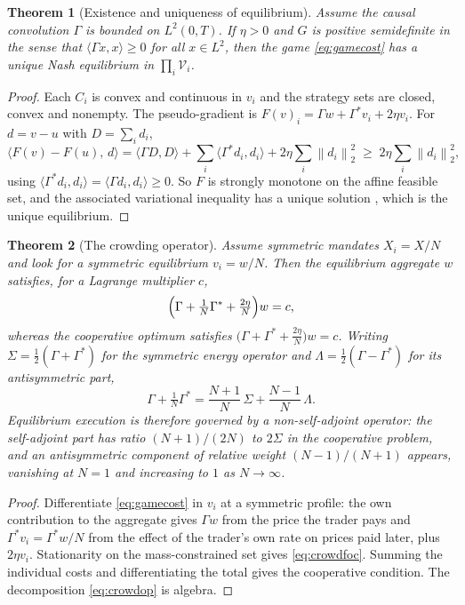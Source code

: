\documentclass[11pt]{article}
\newcommand{\norm}[1]{\left\lVert #1\right\rVert}
\numberwithin{equation}{section}
\newtheorem{theorem}{Theorem}[section]
\theoremstyle{definition}
\theoremstyle{remark}
\theoremstyle{definition}
\begin{document}
\begin{theorem}[Existence and uniqueness of equilibrium]\label{thm:nash}
Assume the causal convolution $\Gamma$ is bounded on $L^2(0,T)$. If $\eta>0$ and $G$ is positive semidefinite in the sense that
$\langle\Gamma x,x\rangle\ge0$ for all $x\in L^2$, then the game
\eqref{eq:gamecost} has a unique Nash equilibrium in $\prod_i\mathcal V_i$.
\end{theorem}
\begin{proof}
Each $C_i$ is convex and continuous in $v_i$ and the strategy sets are closed,
convex and nonempty. The pseudo-gradient is
$F(v)_i=\Gamma w+\Gamma^*v_i+2\eta v_i$. For $d=v-u$ with $D=\sum_id_i$,
\[
 \langle F(v)-F(u),\,d\rangle
 =\langle\Gamma D,D\rangle+\sum_i\langle\Gamma^*d_i,d_i\rangle
 +2\eta\sum_i\norm{d_i}_2^2 \;\ge\;2\eta\sum_i\norm{d_i}_2^2 ,
\]
using $\langle\Gamma^*d_i,d_i\rangle=\langle\Gamma d_i,d_i\rangle\ge0$. So $F$
is strongly monotone on the affine feasible set, and the associated variational
inequality has a unique solution \citep{facchineipang2003}, which is the unique
equilibrium.
\end{proof}

\begin{theorem}[The crowding operator]\label{thm:crowding}
Assume symmetric mandates $X_i=X/N$ and look for a symmetric equilibrium
$v_i=w/N$. Then the equilibrium aggregate $w$ satisfies, for a Lagrange
multiplier $c$,
\begin{equation}\label{eq:crowdfoc}
 \Bigl(\Gamma+\tfrac1N\Gamma^*+\tfrac{2\eta}N\Bigr)w=c ,
\end{equation}
whereas the cooperative optimum satisfies
$\bigl(\Gamma+\Gamma^*+\tfrac{2\eta}N\bigr)w=c$. Writing
$\Sigma=\tfrac12(\Gamma+\Gamma^*)$ for the symmetric energy operator and
$\Lambda=\tfrac12(\Gamma-\Gamma^*)$ for its antisymmetric part,
\begin{equation}\label{eq:crowdop}
 \Gamma+\tfrac1N\Gamma^*=\frac{N+1}{N}\,\Sigma+\frac{N-1}{N}\,\Lambda .
\end{equation}
Equilibrium execution is therefore governed by a non-self-adjoint operator: the
self-adjoint part has ratio $(N+1)/(2N)$ to $2\Sigma$ in the
cooperative problem, and an antisymmetric component of relative weight
$(N-1)/(N+1)$ appears, vanishing at $N=1$ and increasing to $1$ as
$N\to\infty$.
\end{theorem}
\begin{proof}
Differentiate \eqref{eq:gamecost} in $v_i$ at a symmetric profile: the own
contribution to the aggregate gives $\Gamma w$ from the price the trader pays
and $\Gamma^*v_i=\Gamma^*w/N$ from the effect of the trader's own rate on prices
paid later, plus $2\eta v_i$. Stationarity on the mass-constrained set gives
\eqref{eq:crowdfoc}. Summing the individual costs and differentiating the total
gives the cooperative condition. The decomposition \eqref{eq:crowdop} is
algebra.
\end{proof}
\end{document}
